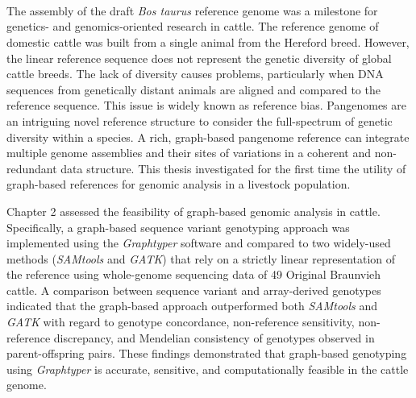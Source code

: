\documentclass[11 pt, a4paper, notitlepage, twoside]{report}
\begin{document}
\newcommand*{\BuildingFromMainFile}{}



\iftwoside
\newpage
\thispagestyle{empty}
\ 
\newpage
\fi


\newpage

\setcounter{tocdepth}{1}
\hypersetup{linkcolor=black}

{}
{
    \pagestyle{plain}
    \tableofcontents
}


\newpage

{}
\listoffigures 
\newpage

{}
\listoftables 
\newpage

{}
\section*{}
\thispagestyle{plain}

\setlength{\parskip}{\baselineskip}
\doublespacing
The assembly of the draft \emph{Bos taurus }reference genome was a milestone for genetics- and genomics-oriented research in cattle. The reference genome of domestic cattle was built from a single animal from the Hereford breed. However, the linear reference sequence does not represent the genetic diversity of global cattle breeds. The lack of diversity causes problems, particularly when DNA sequences from genetically distant animals are aligned and compared to the reference sequence. This issue is widely known as reference bias. Pangenomes are an intriguing novel reference structure to consider the full-spectrum of genetic diversity within a species. A rich, graph-based pangenome reference can integrate multiple  genome assemblies and their sites of variations in a coherent and non-redundant data structure. This thesis investigated for the first time the utility of graph-based references for genomic analysis in a livestock population.

Chapter 2 assessed the feasibility of graph-based genomic analysis in cattle. Specifically, a graph-based sequence variant genotyping approach was implemented using the\emph{ Graphtyper} software and compared to two widely-used methods (\emph{SAMtools } and \emph{GATK}) that rely on a strictly linear representation of the reference using whole-genome sequencing data of 49 Original Braunvieh cattle. A comparison between sequence variant and array-derived genotypes indicated that the graph-based approach outperformed both \emph{SAMtools} and \emph{GATK} with regard to genotype concordance, non-reference sensitivity, non-reference discrepancy, and Mendelian consistency of genotypes observed in parent-offspring pairs. These findings demonstrated that graph-based genotyping using \emph{Graphtyper} is accurate, sensitive, and computationally feasible in the cattle genome. 
\end{document}
